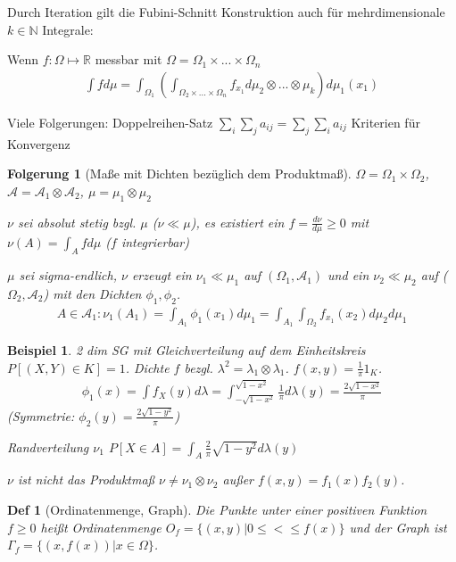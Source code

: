 \documentclass[]{article}
\newtheorem*{corollary}{Folgerung}
\newtheorem*{definition*}{Def}
\newtheorem*{example}{Beispiel}
\begin{document}
Durch Iteration gilt die Fubini-Schnitt Konstruktion auch für mehrdimensionale $k\in\mathbb{N}$ Integrale:

Wenn $f:\Omega\mapsto\mathbb{R}$ messbar mit $\Omega=\Omega_1\times ...\times\Omega_n$
\begin{align*}
	\int f d\mu = \int_{\Omega_1}\left(\int_{\Omega_2\times ...\times\Omega_n} f_{x_1} d\mu_2\otimes ...\otimes \mu_k\right) d\mu_1(x_1)
\end{align*}

Viele Folgerungen: Doppelreihen-Satz $\sum_i\sum_j a_{ij} = \sum_j\sum_i a_{ij}$ Kriterien für Konvergenz

\begin{corollary}[Maße mit Dichten bezüglich dem Produktmaß]
	$\Omega = \Omega_1\times\Omega_2$, $\mathcal{A}=\mathcal{A}_1\otimes\mathcal{A}_2$,  $\mu=\mu_1\otimes\mu_2$
	
	$\nu$ sei absolut stetig bzgl. $\mu$ ($\nu \ll \mu$), es existiert ein $f=\frac{d\nu}{d\mu}\geq 0$ mit $\nu(A)=\int_A f d\mu$ ($f$ integrierbar)
	
	$\mu$ sei sigma-endlich, $\nu$ erzeugt ein $\nu_1 \ll \mu_1$ auf $(\Omega_1, \mathcal{A}_1)$ und ein $\nu_2 \ll \mu_2$ auf ($\Omega_2, \mathcal{A}_2$) mit den Dichten $\phi_1, \phi_2$.
	\begin{align*}
		A \in \mathcal{A}_1: \nu_1(A_1) = \int_{A_1}\phi_1(x_1)d\mu_1 = \int_{A_1} \int_{\Omega_2} f_{x_1}(x_2) d\mu_2 d\mu_1
	\end{align*}
\end{corollary}

\begin{example}
	2 dim SG mit Gleichverteilung auf dem Einheitskreis $P[(X,Y)\in K] = 1$. Dichte $f$ bezgl. $\lambda^2 = \lambda_1\otimes\lambda_1$. $f(x,y)=\frac{1}{\pi}1_K$.
	\begin{align*}
		\phi_1(x)=\int f_X(y)d\lambda = \int_{-\sqrt{1-x^2}}^{\sqrt{1-x^2}}\frac{1}{\pi} d\lambda(y) = \frac{2\sqrt{1-x^2}}{\pi}
	\end{align*}
	(Symmetrie: $\phi_2(y) = \frac{2\sqrt{1-y^2}}{\pi}$)
	
	Randverteilung $\nu_1$ $P[X\in A] = \int_A \frac{2}{\pi}\sqrt{1-y^2} d\lambda(y)$
	
	$\nu$ ist nicht das Produktmaß $\nu \neq \nu_1 \otimes \nu_2$ außer $f(x,y)=f_1(x)f_2(y)$.
\end{example}

\begin{definition*}[Ordinatenmenge, Graph]
	Die Punkte unter einer positiven Funktion $f\geq 0$ heißt Ordinatenmenge $O_f=\{(x,y)|0\leq <\leq f(x)\}$ und der Graph ist $\Gamma_f=\{(x,f(x))|x\in\Omega\}$.
\end{definition*}
\end{document}
